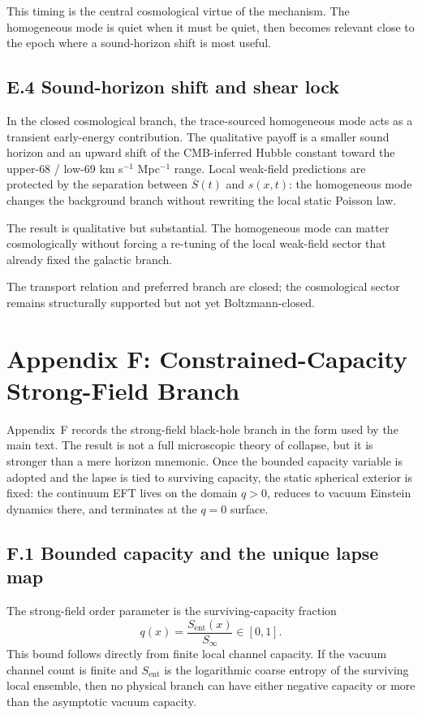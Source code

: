 \documentclass[11pt]{article}
\begin{document}
This timing is the central cosmological virtue of the mechanism. The homogeneous mode is quiet when it must be quiet, then becomes relevant close to the epoch where a sound-horizon shift is most useful.

\subsection*{E.4 Sound-horizon shift and shear lock}

In the closed cosmological branch, the trace-sourced homogeneous mode acts as a transient early-energy contribution. The qualitative payoff is a smaller sound horizon and an upward shift of the CMB-inferred Hubble constant toward the upper-$68$ / low-$69$ km s$^{-1}$ Mpc$^{-1}$ range. Local weak-field predictions are protected by the separation between $\overline S(t)$ and $s(x,t)$: the homogeneous mode changes the background branch without rewriting the local static Poisson law.

The result is qualitative but substantial. The homogeneous mode can matter cosmologically without forcing a re-tuning of the local weak-field sector that already fixed the galactic branch.

The transport relation and preferred branch are closed; the cosmological sector remains structurally supported but not yet Boltzmann-closed.

\section*{Appendix F: Constrained-Capacity Strong-Field Branch}

Appendix~F records the strong-field black-hole branch in the form used by the main text. The result is not a full microscopic theory of collapse, but it is stronger than a mere horizon mnemonic. Once the bounded capacity variable is adopted and the lapse is tied to surviving capacity, the static spherical exterior is fixed: the continuum EFT lives on the domain $q>0$, reduces to vacuum Einstein dynamics there, and terminates at the $q=0$ surface.

\subsection*{F.1 Bounded capacity and the unique lapse map}

The strong-field order parameter is the surviving-capacity fraction
\[
q(x)=\frac{S_{\mathrm{ent}}(x)}{S_\infty}\in[0,1].
\]
This bound follows directly from finite local channel capacity. If the vacuum channel count is finite and $S_{\mathrm{ent}}$ is the logarithmic coarse entropy of the surviving local ensemble, then no physical branch can have either negative capacity or more than the asymptotic vacuum capacity.
\end{document}
